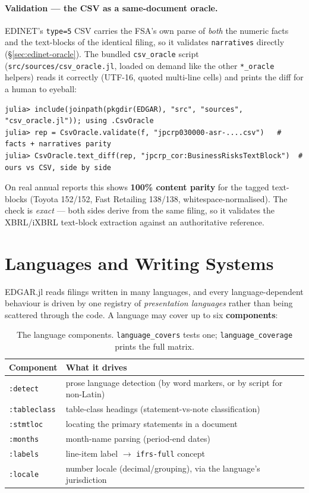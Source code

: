 \documentclass[11pt,a4paper]{report}
\begin{document}
\paragraph{Validation --- the CSV as a same-document oracle.} EDINET's \texttt{type=5} CSV carries the FSA's
own parse of \emph{both} the numeric facts and the text-blocks of the identical filing, so it validates
\texttt{narratives} directly (\S\ref{sec:edinet-oracle}). The bundled \texttt{csv\_oracle} script
(\texttt{src/sources/csv\_oracle.jl}, loaded on demand like the other \texttt{*\_oracle} helpers) reads it
correctly (UTF-16, quoted multi-line cells) and prints the diff for a human to eyeball:
\begin{lstlisting}
julia> include(joinpath(pkgdir(EDGAR), "src", "sources", "csv_oracle.jl")); using .CsvOracle
julia> rep = CsvOracle.validate(f, "jpcrp030000-asr-....csv")   # facts + narratives parity
julia> CsvOracle.text_diff(rep, "jpcrp_cor:BusinessRisksTextBlock")  # ours vs CSV, side by side
\end{lstlisting}
On real annual reports this shows \textbf{100\% content parity} for the tagged text-blocks (Toyota 152/152,
Fast Retailing 138/138, whitespace-normalised). The check is \emph{exact} --- both sides derive from the same
filing, so it validates the XBRL/iXBRL text-block extraction against an authoritative reference.


\section{Languages and Writing Systems}
\label{sec:api-languages}

EDGAR.jl reads filings written in many languages, and every language-dependent behaviour is driven by one
registry of \emph{presentation languages} rather than being scattered through the code. A language may cover up
to six \textbf{components}:

\begin{table}[h]
\centering\small
\caption{The language components. \texttt{language\_covers} tests one; \texttt{language\_coverage} prints the
full matrix.}
\label{tab:language-components}
\begin{tabular}{@{}ll@{}}
\toprule
\textbf{Component} & \textbf{What it drives} \\
\midrule
\texttt{:detect}     & prose language detection (by word markers, or by script for non-Latin) \\
\texttt{:tableclass} & table-class headings (statement-vs-note classification) \\
\texttt{:stmtloc}    & locating the primary statements in a document \\
\texttt{:months}     & month-name parsing (period-end dates) \\
\texttt{:labels}     & line-item label $\to$ \texttt{ifrs-full} concept \\
\texttt{:locale}     & number locale (decimal/grouping), via the language's jurisdiction \\
\bottomrule
\end{tabular}
\end{table}
\end{document}
